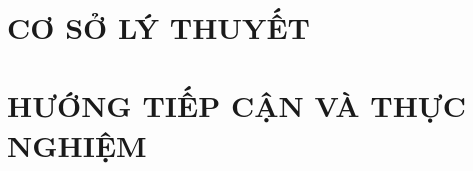 \documentclass[a4paper,12pt,oneside]{report}
\title{\bf \TITLE}
\author{\AUTHOR}
\theoremstyle{definition}
\begin{document}
\restoregeometry

\pagestyle{empty} %
\newpage
{} %
\tableofcontents %
\newpage
\listoffigures %
\newpage
\listoftables %

\glsaddall 
\renewcommand*{\glossaryname}{Danh sách thuật ngữ}
\renewcommand*{\acronymname}{Danh sách từ viết tắt}
\renewcommand*{\entryname}{Tiếng Anh}
\renewcommand*{\descriptionname}{Tiếng Việt}
\printnoidxglossary

\newpage
{}

\newpage
\pagestyle{fancy} %
\chapter{CƠ SỞ LÝ THUYẾT}


\chapter{HƯỚNG TIẾP CẬN VÀ THỰC NGHIỆM}


\newpage
{}
\nocite{*} %
\pagestyle{plain}
\printbibliography %
\end{document}
